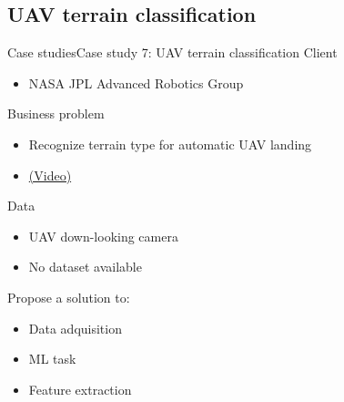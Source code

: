 \documentclass[10pt,compress]{beamer} %
\begin{document}
\subsection{UAV terrain classification}
\begin{frame}{Case studies}{Case study 7: UAV terrain classification}
		Client
		\begin{itemize}
			\item NASA JPL Advanced Robotics Group
		\end{itemize}
		Business problem
		\begin{itemize}
			\item Recognize terrain type for automatic UAV landing
			\item \href{https://www.youtube.com/watch?v=ovtpwxiIr_8}{(Video)}
		\end{itemize}
		Data
		\begin{itemize}
			\item UAV down-looking camera
			\item No dataset available
		\end{itemize}
		Propose a solution to:
		\begin{itemize}
			\item Data adquisition
			\item ML task
            \item Feature extraction
		\end{itemize}
\end{frame}
\end{document}
